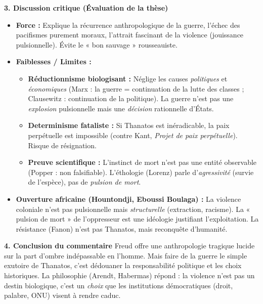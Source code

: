 \documentclass[11pt]{article}
\newcommand{\cle}[1]{{\popxbold\color{popdark}#1}}
\begin{document}
\begin{exoresolu}
\textbf{3. Discussion critique (Évaluation de la thèse)}
\begin{itemize}
    \item \textbf{Force :} Explique la \cle{récurrence} anthropologique de la guerre, l'échec des pacifismes purement moraux, l'attrait fascinant de la violence (jouissance pulsionnelle). Évite le « bon sauvage » rousseauiste.
    \item \textbf{Faiblesses / Limites :}
        \begin{itemize}
            \item \textbf{Réductionnisme biologisant :} Néglige les causes \emph{politiques} et \emph{économiques} (Marx : la guerre = continuation de la lutte des classes ; Clausewitz : continuation de la politique). La guerre n'est pas une \emph{explosion} pulsionnelle mais une \emph{décision} rationnelle d'États.
            \item \textbf{Determinisme fataliste :} Si Thanatos est inéradicable, la paix perpétuelle est impossible (contre Kant, \emph{Projet de paix perpétuelle}). Risque de résignation.
            \item \textbf{Preuve scientifique :} L'instinct de mort n'est pas une entité observable (Popper : non falsifiable). L'éthologie (Lorenz) parle d'\emph{agressivité} (survie de l'espèce), pas de \emph{pulsion de mort}.
        \end{itemize}
    \item \textbf{Ouverture africaine (Hountondji, Eboussi Boulaga) :} La violence coloniale n'est pas pulsionnelle mais \emph{structurelle} (extraction, racisme). La « pulsion de mort » de l'oppresseur est une \cle{idéologie} justifiant l'exploitation. La résistance (Fanon) n'est pas Thanatos, mais \cle{reconquête d'humanité}.
\end{itemize}

\textbf{4. Conclusion du commentaire}
Freud offre une \cle{anthropologie tragique} lucide sur la part d'ombre indépassable en l'homme. Mais faire de la guerre le simple exutoire de Thanatos, c'est dédouaner la \cle{responsabilité politique} et les \cle{choix historiques}. La philosophie (Arendt, Habermas) répond : la violence n'est pas un destin biologique, c'est un \emph{choix} que les institutions démocratiques (droit, palabre, ONU) visent à rendre caduc.
\end{exoresolu}
\end{document}
